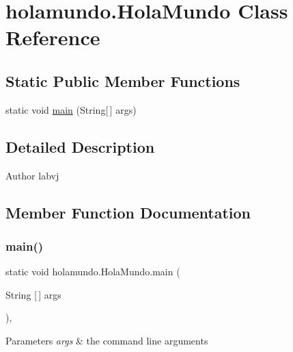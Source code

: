 \hypertarget{classholamundo_1_1_hola_mundo}{}\section{holamundo.\+Hola\+Mundo Class Reference}
\label{classholamundo_1_1_hola_mundo}
\subsection*{Static Public Member Functions}
\begin{DoxyCompactItemize}
\item 
static void \mbox{\hyperlink{classholamundo_1_1_hola_mundo_ae24608856640929598a2b9d03bee2545}{main}} (String\mbox{[}$\,$\mbox{]} args)
\end{DoxyCompactItemize}


\subsection{Detailed Description}
\begin{DoxyAuthor}{Author}
labvj 
\end{DoxyAuthor}


\subsection{Member Function Documentation}
\mbox{\label{classholamundo_1_1_hola_mundo_ae24608856640929598a2b9d03bee2545}} 
\subsubsection{\texorpdfstring{main()}{main()}}
{\footnotesize\ttfamily static void holamundo.\+Hola\+Mundo.\+main (\begin{DoxyParamCaption}\item[{String \mbox{[}$\,$\mbox{]}}]{args }\end{DoxyParamCaption})\hspace{0.3cm}{\ttfamily [inline]}, {\ttfamily [static]}}


\begin{DoxyParams}{Parameters}
{\em args} & the command line arguments \\
\hline
\end{DoxyParams}

